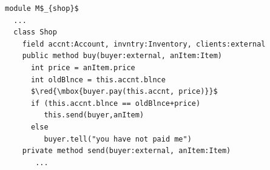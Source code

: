 { %


\begin{lstlisting}[mathescape=true, language=Chainmail, frame=lines]
module M$_{shop}$
  ...   
  class Shop
    field accnt:Account, invntry:Inventory, clients:external      
    public method buy(buyer:external, anItem:Item)
      int price = anItem.price
      int oldBlnce = this.accnt.blnce
      $\red{\mbox{buyer.pay(this.accnt, price)}}$      
      if (this.accnt.blnce == oldBlnce+price)  
         this.send(buyer,anItem)
      else
         buyer.tell("you have not paid me")      
    private method send(buyer:external, anItem:Item)  
       ...         
\end{lstlisting}
 
 



}
